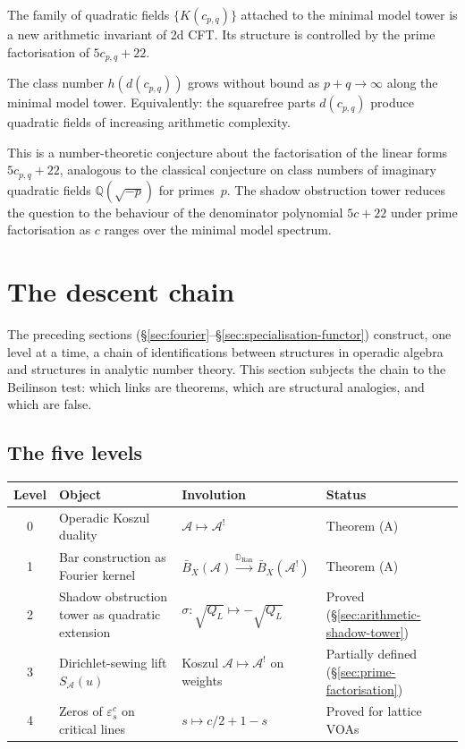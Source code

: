 \documentclass[11pt]{article}
\newcommand{\cA}{\mathcal{A}}
\newcommand{\B}{\bar{B}}
\newcommand{\Q}{\mathbb{Q}}
\newcommand{\bD}{\mathbb{D}}
\newcommand{\Ran}{\operatorname{Ran}}
\begin{document}
The family of quadratic fields $\{K(c_{p,q})\}$ attached to
the minimal model tower is a new arithmetic invariant of 2d
CFT.  Its structure is controlled by the prime factorisation
of $5c_{p,q} + 22$.

\begin{conjecture}
\label{conj:class-number-growth}
The class number $h(d(c_{p,q}))$ grows without bound as
$p + q \to \infty$ along the minimal model tower.
Equivalently: the squarefree parts $d(c_{p,q})$ produce
quadratic fields of increasing arithmetic complexity.
\end{conjecture}

This is a number-theoretic conjecture about the factorisation
of the linear forms $5c_{p,q} + 22$, analogous to the
classical conjecture on class numbers of imaginary quadratic
fields $\Q(\sqrt{-p})$ for primes~$p$.  The shadow obstruction tower reduces the question to the
behaviour of the denominator polynomial
$5c + 22$ under prime factorisation as $c$ ranges over
the minimal model spectrum.


\section{The descent chain}
\label{sec:descent-chain}

The preceding sections (\S\ref{sec:fourier}--\S\ref{sec:specialisation-functor})
construct, one level at a time, a chain of identifications between
structures in operadic algebra and structures in analytic number
theory.  This section subjects the chain to the Beilinson test:
which links are theorems, which are structural analogies, and
which are false.

\subsection{The five levels}

\begin{center}
\small
\renewcommand{\arraystretch}{1.3}
\begin{tabular}{@{}clll@{}}
\textbf{Level} & \textbf{Object} & \textbf{Involution} & \textbf{Status} \\
\hline
0 & Operadic Koszul duality
  & $\cA \mapsto \cA^!$
  & Theorem (A) \\[3pt]
1 & Bar construction as Fourier kernel
  & $\B_X(\cA) \xrightarrow{\bD_{\Ran}} \B_X(\cA^!)$
  & Theorem (A) \\[3pt]
2 & Shadow obstruction tower as quadratic extension
  & $\sigma\colon \sqrt{Q_L} \mapsto -\sqrt{Q_L}$
  & Proved (\S\ref{sec:arithmetic-shadow-tower}) \\[3pt]
3 & Dirichlet-sewing lift $S_\cA(u)$
  & Koszul $\cA \mapsto \cA^!$ on weights
  & Partially defined (\S\ref{sec:prime-factorisation}) \\[3pt]
4 & Zeros of $\varepsilon^c_s$ on critical lines
  & $s \mapsto c/2 + 1 - s$
  & Proved for lattice VOAs
\end{tabular}
\end{center}
\end{document}

